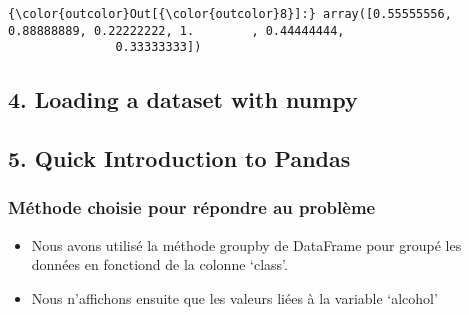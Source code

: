 \documentclass[11pt]{article}
\providecommand{\tightlist}{%
      \setlength{\itemsep}{0pt}\setlength{\parskip}{0pt}}
\begin{document}
\begin{Verbatim}[commandchars=\\\{\}]
{\color{outcolor}Out[{\color{outcolor}8}]:} array([0.55555556, 0.88888889, 0.22222222, 1.        , 0.44444444,
               0.33333333])
\end{Verbatim}
            
    \hypertarget{loading-a-dataset-with-numpy}{%
\subsection{4. Loading a dataset with
numpy}\label{loading-a-dataset-with-numpy}}

    \hypertarget{quick-introduction-to-pandas}{%
\subsection{5. Quick Introduction to
Pandas}\label{quick-introduction-to-pandas}}

    \hypertarget{muxe9thode-choisie-pour-ruxe9pondre-au-probluxe8me}{%
\subsubsection{Méthode choisie pour répondre au
problème}\label{muxe9thode-choisie-pour-ruxe9pondre-au-probluxe8me}}

    \begin{itemize}
\tightlist
\item
  Nous avons utilisé la méthode groupby de DataFrame pour groupé les
  données en fonctiond de la colonne `class'.
\item
  Nous n'affichons ensuite que les valeurs liées à la variable `alcohol'
\end{itemize}
\end{document}
